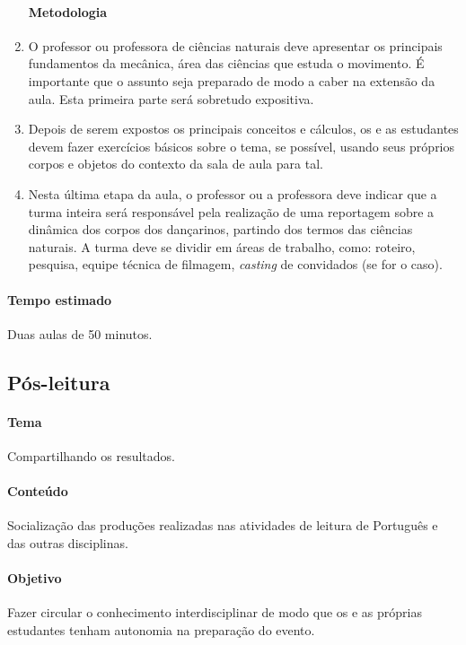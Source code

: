 \documentclass[12pt]{extarticle}
\begin{document}
\begin{enumerate}
\paragraph{Metodologia}

  \item
  O professor ou professora de ciências naturais deve apresentar os 
  principais fundamentos da mecânica, área das ciências que estuda
  o movimento. É importante que o assunto seja preparado de modo
  a caber na extensão da aula. Esta primeira parte será sobretudo expositiva.

  \item
  Depois de serem expostos os principais conceitos e cálculos,
  os e as estudantes devem fazer exercícios básicos sobre o tema, 
  se possível, usando seus próprios corpos e objetos do contexto
  da sala de aula para tal. 

  \item
  Nesta última etapa da aula, o professor ou a professora deve indicar que a turma inteira
  será responsável pela realização de uma reportagem sobre a dinâmica dos 
  corpos dos dançarinos, partindo dos termos das ciências naturais. A turma deve
  se dividir em áreas de trabalho, como: roteiro, pesquisa, equipe técnica de
  filmagem, \textit{casting} de convidados (se for o caso).

\end{enumerate}

\paragraph{Tempo estimado} Duas aulas de 50 minutos.


\subsection{Pós-leitura}

\paragraph{Tema} Compartilhando os resultados.

\paragraph{Conteúdo} Socialização das produções realizadas nas atividades de leitura de Português e das outras disciplinas.

\paragraph{Objetivo} Fazer circular o conhecimento interdisciplinar de modo
que os e as próprias estudantes tenham autonomia na preparação do evento.
\end{document}
